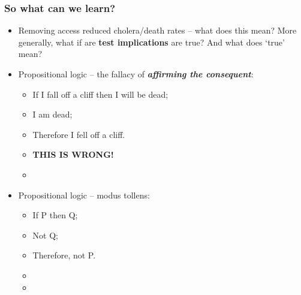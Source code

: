 \documentclass[aspectratio=169]{beamer}
\theoremstyle{principle}
\begin{document}
\begin{frame}
\frametitle{So what can we learn?}
\begin{itemize}
\item Removing access reduced cholera/death rates -- what does this mean?  More generally, what if are \textbf{test implications} are true?  And what does `true' mean?
\bigskip
\item Propositional logic -- the fallacy of \textit{\textbf{affirming the consequent}}:
\begin{itemize}
\item If I fall off a cliff then I will be dead;
\item I am dead;
\item Therefore I fell off a cliff.
\item \textbf{THIS IS WRONG!}
\item[]
\end{itemize}
\bigskip
\item[]  \color{white}Propositional logic -- modus tollens:
\begin{itemize}
\item[] \color{white}If P then Q;
\item[] \color{white}Not Q;
\item[] \color{white}Therefore, not P.
\item[]
\item[]
 \end{itemize}
\end{itemize}

\end{frame}
\end{document}
